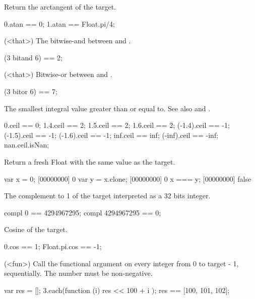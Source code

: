 \begin{urbiscriptapi}
\item[atan]
  Return the arctangent of the target.
\begin{urbiassert}
0.atan == 0;
1.atan == Float.pi/4;
\end{urbiassert}

\item['bitand'](<that>)%
  The bitwise-and between \this and .
\begin{urbiassert}
(3 bitand 6) == 2;
\end{urbiassert}

\item['bitor'](<that>)%
  Bitwise-or between \this and .
\begin{urbiassert}
(3 bitor 6) == 7;
\end{urbiassert}

\item[ceil] The smallest integral value greater than or equal to.  See also
   and .
\begin{urbiassert}
     0.ceil ==  0;
   1.4.ceil ==  2;     1.5.ceil ==  2;    1.6.ceil ==  2;
(-1.4).ceil == -1;  (-1.5).ceil == -1; (-1.6).ceil == -1;
   inf.ceil == inf; (-inf).ceil == -inf;
   nan.ceil.isNan;
\end{urbiassert}

\item[clone]
  Return a fresh Float with the same value as the target.
\begin{urbiscript}
var x = 0;
[00000000] 0
var y = x.clone;
[00000000] 0
x === y;
[00000000] false
\end{urbiscript}

\item[compl]
  The complement to 1 of the target interpreted as a 32 bits integer.
\begin{urbiassert}
compl 0 == 4294967295;
compl 4294967295 == 0;
\end{urbiassert}

\item[cos]
  Cosine of the target.
\begin{urbiassert}
0.cos == 1;
Float.pi.cos == -1;
\end{urbiassert}

\item[each](<fun>)%
  Call the functional argument  on every integer from 0 to
  target - 1, sequentially.  The number must be non-negative.
\begin{urbiassert}
{
  var res = [];
  3.each(function (i) { res << 100 + i });
  res
}
== [100, 101, 102];


\end{urbiassert}
\end{urbiscriptapi}
